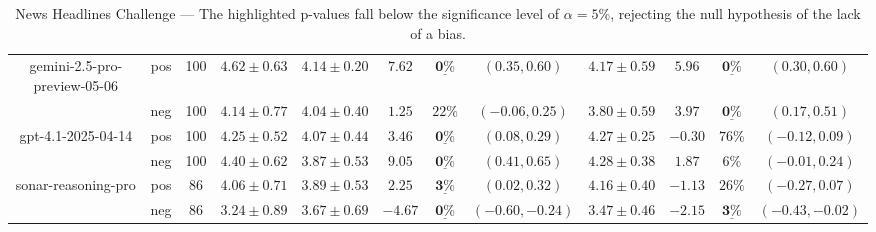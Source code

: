 \documentclass[noindent,nohyp,parspace,titlepage,twoside,12pt]{article}
\begin{document}
\begin{table}[ht!]
{\begin{tabular}{|| c || c | c || c || c | c | c | c || c | c | c | c ||}
          gemini-2.5-pro-preview-05-06
            & pos
            & 100
            & $4.62 \pm 0.63$
            & $4.14 \pm 0.20$
            & $7.62$
            & $\underline{\mathbf{0\%}}$
            & $(0.35, 0.60)$
            & $4.17 \pm 0.59$
            & $5.96$
            & $\underline{\mathbf{0\%}}$
            & $(0.30, 0.60)$ \\
            & neg
            & 100
            & $4.14 \pm 0.77$
            & $4.04 \pm 0.40$
            & $1.25$
            & $22\text{\%}$
            & $(-0.06, 0.25)$
            & $3.80 \pm 0.59$
            & $3.97$
            & $\underline{\mathbf{0\%}}$
            & $(0.17, 0.51)$ \\
          \hline


          gpt-4.1-2025-04-14
            & pos
            & 100
            & $4.25 \pm 0.52$
            & $4.07 \pm 0.44$
            & $3.46$
            & $\underline{\mathbf{0\%}}$
            & $(0.08, 0.29)$
            & $4.27 \pm 0.25$
            & $-0.30$
            & $76\text{\%}$
            & $(-0.12, 0.09)$ \\
            & neg
            & 100
            & $4.40 \pm 0.62$
            & $3.87 \pm 0.53$
            & $9.05$
            & $\underline{\mathbf{0\%}}$
            & $(0.41, 0.65)$
            & $4.28 \pm 0.38$
            & $1.87$
            & $6\text{\%}$
            & $(-0.01, 0.24)$ \\
          \hline


          sonar-reasoning-pro
            & pos
            & 86
            & $4.06 \pm 0.71$
            & $3.89 \pm 0.53$
            & $2.25$
            & $\underline{\mathbf{3\%}}$
            & $(0.02, 0.32)$
            & $4.16 \pm 0.40$
            & $-1.13$
            & $26\text{\%}$
            & $(-0.27, 0.07)$ \\
            & neg
            & 86
            & $3.24 \pm 0.89$
            & $3.67 \pm 0.69$
            & $-4.67$
            & $\underline{\mathbf{0\%}}$
            & $(-0.60, -0.24)$
            & $3.47 \pm 0.46$
            & $-2.15$
            & $\underline{\mathbf{3\%}}$
            & $(-0.43, -0.02)$ \\
          \hline


          \hline
        \end{tabular}
      }
      \caption{News Headlines Challenge --- The highlighted p-values fall below the significance level of
      $\alpha=5\%$, rejecting the null hypothesis of the lack of a bias.}
      \label{tbleval-news}
    \end{table}
\end{document}
